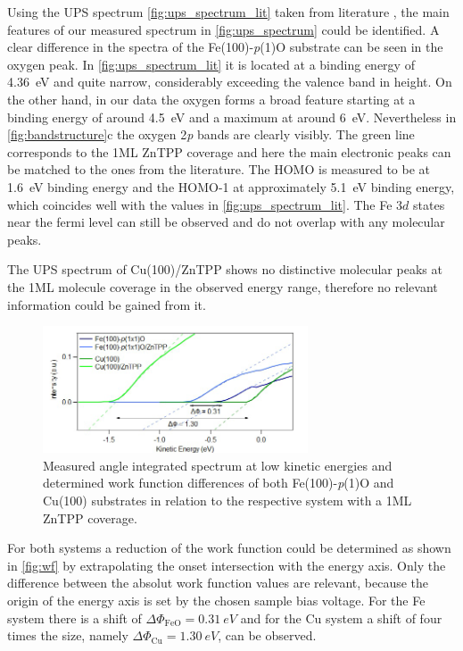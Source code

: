 \FloatBarrier
Using the UPS spectrum \autoref{fig:ups_spectrum_lit} taken from literature \cite*{tesi}, the main features of our measured spectrum in \autoref{fig:ups_spectrum} could be identified.
A clear difference in the spectra of the Fe(100)-\textit{p}(1)O substrate can be seen in the oxygen peak. In \autoref{fig:ups_spectrum_lit} it is located at a binding energy of \qty{4.36}{eV} and quite narrow, considerably exceeding the valence band in height. 
On the other hand, in our data the oxygen forms a broad feature starting at a binding energy of around \qty{4.5}{eV} and a maximum at around \qty{6}{eV}.
Nevertheless in \autoref{fig:bandstructure}c the oxygen 2\textit{p} bands are clearly visibly.
The green line corresponds to the 1ML ZnTPP coverage and here the main electronic peaks can be matched to the ones from the literature.
The HOMO is measured to be at \qty{1.6}{eV} binding energy and the HOMO-1 at approximately \qty{5.1}{eV} binding energy, which coincides well with the values in \autoref{fig:ups_spectrum_lit}.
The Fe $3d$ states near the fermi level can still be observed and do not overlap with any molecular peaks.

The UPS spectrum of Cu(100)/ZnTPP shows no distinctive molecular peaks at the 1ML molecule coverage in the observed energy range, therefore no relevant information could be gained from it.

\begin{figure}[h]
    \centering
    \includegraphics[width = 0.7\textwidth]{Plots/WF.png}
    \caption{Measured angle integrated spectrum at low kinetic energies and determined work function differences of both Fe(100)-\textit{p}(1)O and Cu(100) substrates in relation to the respective system with a 1ML ZnTPP coverage.}
    \label{fig:wf}
\end{figure}


For both systems a reduction of the work function could be determined as shown in \autoref{fig:wf} by extrapolating the onset intersection with the energy axis. Only the difference between the absolut work function values are relevant, because the origin of the energy axis is set by the chosen sample bias voltage.
For the Fe system there is a shift of $\Delta\Phi_{\mathrm{FeO}} = \qty{0.31}{eV}$ and for the Cu system a shift of four times the size, namely $\Delta\Phi_{\mathrm{Cu}} = \qty{1.30}{eV}$, can be observed.


